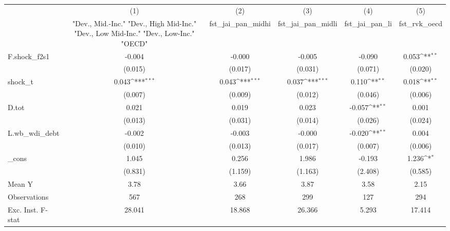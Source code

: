 {
\def\sym#1{\ifmmode^{#1}\else\(^{#1}\)\fi}
\begin{tabular}{l*{5}{c}}
\toprule
            &\multicolumn{1}{c}{(1)}&\multicolumn{1}{c}{(2)}&\multicolumn{1}{c}{(3)}&\multicolumn{1}{c}{(4)}&\multicolumn{1}{c}{(5)}\\
            &\multicolumn{1}{c}{ "Dev., Mid.-Inc." "Dev., High Mid-Inc." "Dev., Low Mid-Inc." "Dev., Low-Inc." "OECD" }&\multicolumn{1}{c}{fst\_jai\_pan\_midhi}&\multicolumn{1}{c}{fst\_jai\_pan\_midli}&\multicolumn{1}{c}{fst\_jai\_pan\_li}&\multicolumn{1}{c}{fst\_rvk\_oecd}\\
\midrule
F.shock\_f2s1&      -0.004         &      -0.000         &      -0.005         &      -0.090         &       0.053\sym{**} \\
            &     (0.015)         &     (0.017)         &     (0.031)         &     (0.071)         &     (0.020)         \\
\addlinespace
shock\_t     &       0.043\sym{***}&       0.043\sym{***}&       0.037\sym{***}&       0.110\sym{**} &       0.018\sym{**} \\
            &     (0.007)         &     (0.009)         &     (0.012)         &     (0.046)         &     (0.006)         \\
\addlinespace
D.tot       &       0.021         &       0.019         &       0.023         &      -0.057\sym{**} &       0.001         \\
            &     (0.013)         &     (0.031)         &     (0.014)         &     (0.026)         &     (0.024)         \\
\addlinespace
L.wb\_wdi\_debt&      -0.002         &      -0.003         &      -0.000         &      -0.020\sym{**} &       0.004         \\
            &     (0.010)         &     (0.013)         &     (0.017)         &     (0.007)         &     (0.006)         \\
\addlinespace
\_cons      &       1.045         &       0.256         &       1.986         &      -0.193         &       1.236\sym{*}  \\
            &     (0.831)         &     (1.159)         &     (1.163)         &     (2.408)         &     (0.585)         \\
\midrule
Mean Y      &        3.78         &        3.66         &        3.87         &        3.58         &        2.15         \\
Observations&         567         &         268         &         299         &         127         &         294         \\
Exc. Inst. F-stat&      28.041         &      18.868         &      26.366         &       5.293         &      17.414         \\
\bottomrule
\end{tabular}
}
